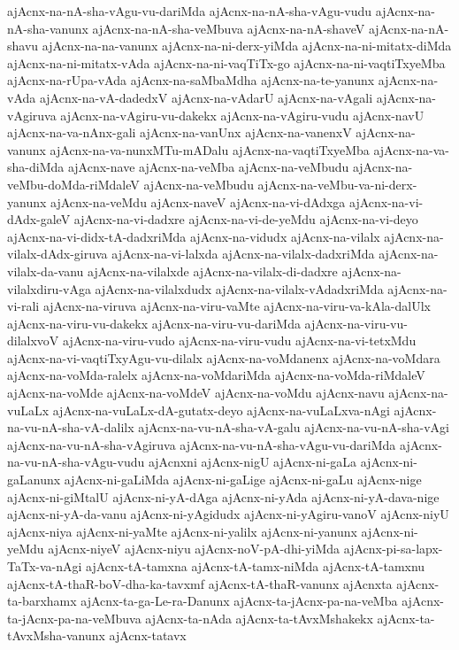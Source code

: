 {ajAcnx-na-nA-sha-vAgu-vu-dariMda
ajAcnx-na-nA-sha-vAgu-vudu
ajAcnx-na-nA-sha-vanunx
ajAcnx-na-nA-sha-veMbuva
ajAcnx-na-nA-shaveV
ajAcnx-na-nA-shavu
ajAcnx-na-na-vanunx
ajAcnx-na-ni-derx-yiMda
ajAcnx-na-ni-mitatx-diMda
ajAcnx-na-ni-mitatx-vAda
ajAcnx-na-ni-vaqTiTx-go
ajAcnx-na-ni-vaqtiTxyeMba
ajAcnx-na-rUpa-vAda
ajAcnx-na-saMbaMdha
ajAcnx-na-te-yanunx
ajAcnx-na-vAda
ajAcnx-na-vA-dadedxV
ajAcnx-na-vAdarU
ajAcnx-na-vAgali
ajAcnx-na-vAgiruva
ajAcnx-na-vAgiru-vu-dakekx
ajAcnx-na-vAgiru-vudu
ajAcnx-navU
ajAcnx-na-va-nAnx-gali
ajAcnx-na-vanUnx
ajAcnx-na-vanenxV
ajAcnx-na-vanunx
ajAcnx-na-va-nunxMTu-mADalu
ajAcnx-na-vaqtiTxyeMba
ajAcnx-na-va-sha-diMda
ajAcnx-nave
ajAcnx-na-veMba
ajAcnx-na-veMbudu
ajAcnx-na-veMbu-doMda-riMdaleV
ajAcnx-na-veMbudu
ajAcnx-na-veMbu-va-ni-derx-yanunx
ajAcnx-na-veMdu
ajAcnx-naveV
ajAcnx-na-vi-dAdxga
ajAcnx-na-vi-dAdx-galeV
ajAcnx-na-vi-dadxre
ajAcnx-na-vi-de-yeMdu
ajAcnx-na-vi-deyo
ajAcnx-na-vi-didx-tA-dadxriMda
ajAcnx-na-vidudx
ajAcnx-na-vilalx
ajAcnx-na-vilalx-dAdx-giruva
ajAcnx-na-vi-lalxda
ajAcnx-na-vilalx-dadxriMda
ajAcnx-na-vilalx-da-vanu
ajAcnx-na-vilalxde
ajAcnx-na-vilalx-di-dadxre
ajAcnx-na-vilalxdiru-vAga
ajAcnx-na-vilalxdudx
ajAcnx-na-vilalx-vAdadxriMda
ajAcnx-na-vi-rali
ajAcnx-na-viruva
ajAcnx-na-viru-vaMte
ajAcnx-na-viru-va-kAla-dalUlx
ajAcnx-na-viru-vu-dakekx
ajAcnx-na-viru-vu-dariMda
ajAcnx-na-viru-vu-dilalxvoV
ajAcnx-na-viru-vudo
ajAcnx-na-viru-vudu
ajAcnx-na-vi-tetxMdu
ajAcnx-na-vi-vaqtiTxyAgu-vu-dilalx
ajAcnx-na-voMdanenx
ajAcnx-na-voMdara
ajAcnx-na-voMda-ralelx
ajAcnx-na-voMdariMda
ajAcnx-na-voMda-riMdaleV
ajAcnx-na-voMde
ajAcnx-na-voMdeV
ajAcnx-na-voMdu
ajAcnx-navu
ajAcnx-na-vuLaLx
ajAcnx-na-vuLaLx-dA-gutatx-deyo
ajAcnx-na-vuLaLxva-nAgi
ajAcnx-na-vu-nA-sha-vA-dalilx
ajAcnx-na-vu-nA-sha-vA-galu
ajAcnx-na-vu-nA-sha-vAgi
ajAcnx-na-vu-nA-sha-vAgiruva
ajAcnx-na-vu-nA-sha-vAgu-vu-dariMda
ajAcnx-na-vu-nA-sha-vAgu-vudu
ajAcnxni
ajAcnx-nigU
ajAcnx-ni-gaLa
ajAcnx-ni-gaLanunx
ajAcnx-ni-gaLiMda
ajAcnx-ni-gaLige
ajAcnx-ni-gaLu
ajAcnx-nige
ajAcnx-ni-giMtalU
ajAcnx-ni-yA-dAga
ajAcnx-ni-yAda
ajAcnx-ni-yA-dava-nige
ajAcnx-ni-yA-da-vanu
ajAcnx-ni-yAgidudx
ajAcnx-ni-yAgiru-vanoV
ajAcnx-niyU
ajAcnx-niya
ajAcnx-ni-yaMte
ajAcnx-ni-yalilx
ajAcnx-ni-yanunx
ajAcnx-ni-yeMdu
ajAcnx-niyeV
ajAcnx-niyu
ajAcnx-noV-pA-dhi-yiMda
ajAcnx-pi-sa-lapx-TaTx-va-nAgi
ajAcnx-tA-tamxna
ajAcnx-tA-tamx-niMda
ajAcnx-tA-tamxnu
ajAcnx-tA-thaR-boV-dha-ka-tavxmf
ajAcnx-tA-thaR-vanunx
ajAcnxta
ajAcnx-ta-barxhamx
ajAcnx-ta-ga-Le-ra-Danunx
ajAcnx-ta-jAcnx-pa-na-veMba
ajAcnx-ta-jAcnx-pa-na-veMbuva
ajAcnx-ta-nAda
ajAcnx-ta-tAvxMshakekx
ajAcnx-ta-tAvxMsha-vanunx
ajAcnx-tatavx
}
